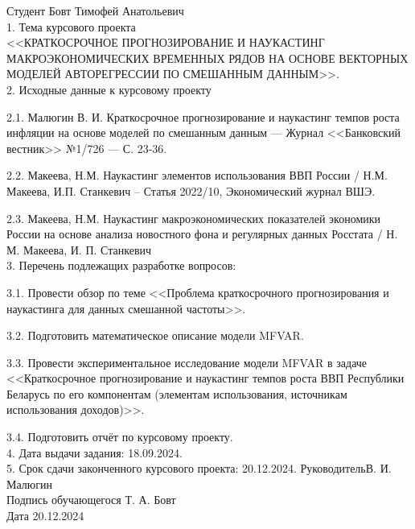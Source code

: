 \documentclass[a4paper, 14pt]{extreport}
\numberwithin{equation}{subsection}
\numberwithin{equation}{section}
\begin{document}
	\small{    Студент \quad Бовт Тимофей Анатольевич\\[2mm]
		1. Тема курсового проекта\\
		<<КРАТКОСРОЧНОЕ ПРОГНОЗИРОВАНИЕ И НАУКАСТИНГ МАКРОЭКОНОМИЧЕСКИХ ВРЕМЕННЫХ РЯДОВ НА ОСНОВЕ ВЕКТОРНЫХ МОДЕЛЕЙ АВТОРЕГРЕССИИ ПО СМЕШАННЫМ ДАННЫМ>>.\\[6mm]
		2. Исходные данные к курсовому проекту
		
		2.1. Малюгин В. И. Краткосрочное прогнозирование и наукастинг темпов роста инфляции на основе моделей по смешанным данным --- Журнал <<Банковский вестник>> №1/726 --- С. 23-36.
		
		2.2. Макеева, Н.М. Наукастинг элементов использования ВВП России / Н.М. Макеева, И.П. Станкевич -- Статья 2022/10, Экономический журнал ВШЭ.
		
		2.3. Макеева, Н.М. Наукастинг макроэкономических показателей экономики России на основе анализа новостного фона и регулярных данных Росстата / Н. М. Макеева, И. П. Станкевич\\[2mm]
		3. Перечень подлежащих разработке вопросов:
		
		3.1. Провести обзор по теме <<Проблема краткосрочного прогнозирования и наукастинга для данных смешанной частоты>>.
		
		3.2. Подготовить математическое описание модели MFVAR.
		
		3.3. Провести экспериментальное исследование модели MFVAR в задаче <<Краткосрочное прогнозирование и наукастинг темпов роста ВВП Республики Беларусь по его компонентам (элементам использования, источникам использования доходов)>>.
		
		3.4. Подготовить отчёт по курсовому проекту.\\[1cm]
		4. Дата выдачи задания: 18.09.2024.\\[6mm]
		5. Срок сдачи законченного курсового проекта: 20.12.2024.
		\vfill
		\noindent Руководитель\hspace*{3cm}\underline{\hspace*{4cm}}\hspace*{4cm}В. И. Малюгин\\[2mm]
		\noindent Подпись обучающегося\hspace*{1.21cm}\underline{\hspace*{4cm}} \hspace*{3.7cm} Т. А. Бовт\\[2mm]
		Дата \hspace*{12.5cm}20.12.2024     
	}\normalsize
	\newpage
	\tableofcontents
	\newpage
\end{document}
